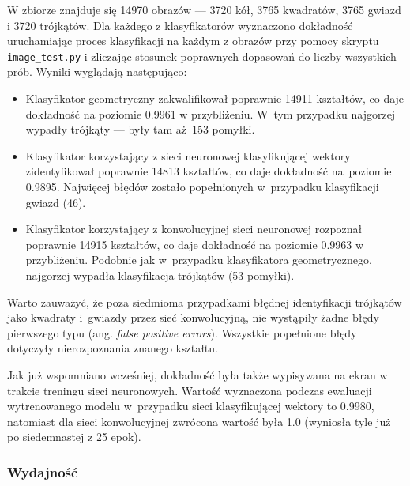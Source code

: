\documentclass[11pt,a4paper]{article}
\begin{document}
W zbiorze \cite{shapes} znajduje się 14970 obrazów --- 3720 kół, 3765 kwadratów, 3765 gwiazd i 3720 trójkątów. Dla każdego z klasyfikatorów wyznaczono dokładność uruchamiając proces klasyfikacji na każdym z obrazów przy pomocy skryptu \verb+image_test.py+ i zliczając stosunek poprawnych dopasowań do liczby wszystkich prób. Wyniki wyglądają następująco:
\begin{itemize}
    \item Klasyfikator geometryczny zakwalifikował poprawnie 14911 kształtów, co daje dokładność na poziomie 0.9961 w przybliżeniu.
    W~tym przypadku najgorzej wypadły trójkąty --- były tam aż~153 pomyłki.
    \item Klasyfikator korzystający z sieci neuronowej klasyfikującej wektory zidentyfikował poprawnie 14813 kształtów, co daje dokładność na~poziomie 0.9895. Najwięcej błędów zostało popełnionych w~przypadku klasyfikacji gwiazd (46).
    \item Klasyfikator korzystający z konwolucyjnej sieci neuronowej rozpoznał poprawnie 14915 kształtów, co daje dokładność na poziomie 0.9963 w przybliżeniu. Podobnie jak w~przypadku klasyfikatora geometrycznego, najgorzej wypadła klasyfikacja trójkątów (53 pomyłki).
\end{itemize}

Warto zauważyć, że poza siedmioma przypadkami błędnej identyfikacji trójkątów jako kwadraty i~gwiazdy przez sieć konwolucyjną, nie wystąpiły żadne błędy pierwszego typu (ang. \emph{false positive errors}). Wszystkie popełnione błędy dotyczyły nierozpoznania znanego kształtu.

Jak już wspomniano wcześniej, dokładność była także wypisywana na ekran w trakcie treningu sieci neuronowych. Wartość wyznaczona podczas ewaluacji wytrenowanego modelu w~przypadku sieci klasyfikującej wektory to 0.9980, natomiast dla sieci konwolucyjnej zwrócona wartość była 1.0 (wyniosła tyle już po siedemnastej z 25 epok).

\subsubsection{Wydajność}
\end{document}
